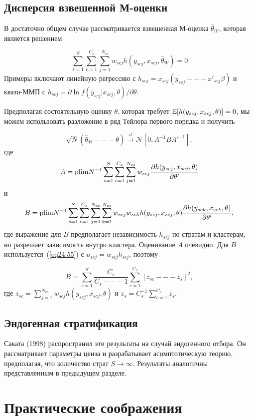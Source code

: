 \subsection*{Дисперсия взвешенной М-оценки}

В достаточно общем случае рассматривается взвешенная М-оценка $\hat \theta_W$, которая является решением

$$
\sum_{s=1}^S \sum_{c=1}^{C_s} \sum_{j=1}^{N_{cs}} w_{scj} h( y_{scj}, x_{scj}, \hat \theta_W) = 0
$$
Примеры включают линейную регрессию с $h_{scj} = x_{scj} (y_{scj} --- x'_{scj} \beta)$ и квази-ММП с $h_{scj} = \partial \ln f (y_{scj} | x_{scj}, \theta) / \partial \theta$. 

Предполагая состоятельную оценку $\theta$, которая требует $\mathbb{E}[h(y_{scj}, x_{scj}, \theta)] = 0$, мы можем использовать разложение в ряд Тейлора первого порядка и получить

$$
\sqrt{N} (\hat \theta_W --- \theta) \overset{d}{\to} \mathcal N \left[  0, A^{-1} B A'^{-1} \right],
$$
где
$$
A = \mathrm{plim } N^{-1} \sum_{s=1}^S \sum_{c=1}^{C_s} \sum_{j=1}^{N_{cs}} w_{scj} \frac{\partial h(y_{scj}, x_{scj}, \theta)}{\partial \theta'}
$$
и
$$
B = \mathrm{plim } N^{-1} \sum_{s=1}^S \sum_{c=1}^{C_s} \sum_{j=1}^{N_{cs}} \sum_{k=1}^{N_{cs}} w_{scj} w_{sck} h(y_{scj}, x_{scj}, \theta)  \frac{\partial h(y_{sck}, x_{sck}, \theta)}{\partial \theta'},
$$
где выражение для $B$ предполагает независимость $h_{scj}$ по стратам и кластерам, но разрешает зависимость внутри кластера. Оценивание $A$ очевидно. Для $B$ используется~(\ref{eq24.55}) с $u_{scj} = w_{scj} h_{scj}$, поэтому

$$
B = \sum_{s=1}^S \frac{C_s}{C_s --- 1} \sum_{c=1}^{C_s} [\overline{z}_{sc} --- \overline{z}_s]^2, 
$$
где $ \overline{z}_{sc} = \sum_{j=1}^{N_{cs}} w_{scj} h (y_{scj}, x_{scj}, \theta)$ и $\overline{z}_{s} = C_s^{-1} \sum_{c=1}^{C_s} \overline{z}_{s}$. 

\subsection*{Эндогенная стратификация}

Саката (1998) распространил эти результаты на случай эндогенного отбора. Он рассматривает параметры ценза и разрабатывает асимптотическую теорию, предполагая, что количество страт $S \to \infty$. Результаты аналогичны представленным в предыдущем разделе. 

\section{Практические соображения}

